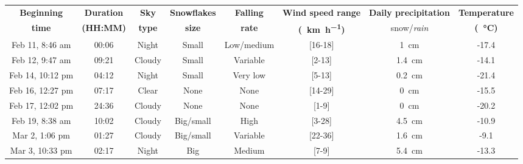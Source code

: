 \begin{table}[htbp]
    \centering
    \\
    \\
    \begin{tabular}{|c|c|c|c|c|c|c|c|}
        \hline
        \textbf{Beginning} & \textbf{Duration} & \textbf{Sky}  & \textbf{Snowflakes} & \textbf{Falling} & \textbf{Wind speed range}      & \textbf{Daily precipitation}  & \textbf{Temperature}     \\
        \textbf{time}      & \textbf{(HH:MM)}  & \textbf{type} & \textbf{size}       & \textbf{rate}    & \textbf{(\SI{}{\km\per\hour})} & snow/\textit{rain}            & \textbf{(\SI{}{\celsius})}      \\\hline
        Feb 11, 8:46 am    &  00:06            & Night         & Small               & Low/medium       & [16-18]                        & \SI{1}{\cm}                   & -17.4 \\\hline
        Feb 12, 9:47 am    &  09:21            & Cloudy        & Small               & Variable         & [2-13]                         & \SI{1.4}{\cm}                 & -14.1 \\\hline
        Feb 14, 10:12 pm   &  04:12            & Night         & Small               & Very low         & [5-13]                         & \SI{0.2}{\cm}                 & -21.4 \\\hline
        Feb 16, 12:27 pm   &  07:17            & Clear         & None                & None             & [14-29]                        & \SI{0}{\cm}                   & -15.5 \\\hline
        Feb 17, 12:02 pm   &  24:36            & Cloudy        & None                & None             & [1-9]                          & \SI{0}{\cm}                   & -20.2 \\\hline
        Feb 19, 8:38 am    &  10:02            & Cloudy        & Big/small           & High             & [3-28]                         & \SI{4.5}{\cm}                 & -10.9 \\\hline
        Mar 2, 1:06 pm     &  01:27            & Cloudy        & Big/small           & Variable         & [22-36]                        & \SI{1.6}{\cm}                 & -9.1  \\\hline
        Mar 3, 10:33 pm    &  02:17            & Night         & Big                 & Medium           & [7-9]                          & \SI{5.4}{\cm}                 & -13.3 \\\hline

\end{tabular}
\end{table}
